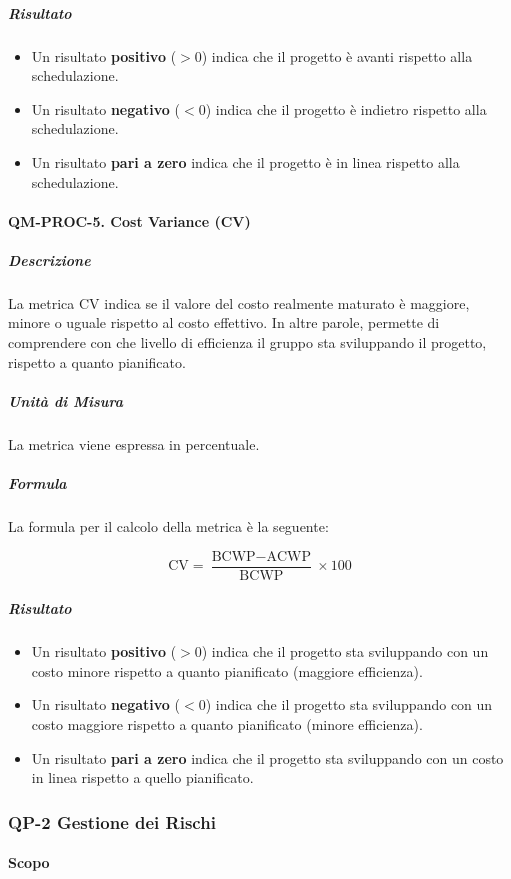 			\subparagraph{Risultato}
			\begin{itemize}
				\item Un risultato \textbf{positivo} (\(> 0\)) indica che il progetto è avanti rispetto alla schedulazione.
				\item Un risultato \textbf{negativo} (\(< 0\)) indica che il progetto è indietro rispetto alla schedulazione.
				\item Un risultato \textbf{pari a zero} indica che il progetto è in linea rispetto alla schedulazione.
			\end{itemize}

		\paragraph{QM-PROC-5. Cost Variance (CV)}

			\subparagraph{Descrizione}
			La metrica CV indica se il valore del costo realmente maturato è maggiore, minore o uguale rispetto al costo effettivo. In altre parole, permette di comprendere con che livello di efficienza il gruppo sta sviluppando il progetto, rispetto a quanto pianificato.

			\subparagraph{Unità di Misura}
			La metrica viene espressa in percentuale.

			\subparagraph{Formula}
			La formula per il calcolo della metrica è la seguente:

			\[
				\text{CV} = \frac{\text{BCWP} - \text{ACWP}}{\text{BCWP}} \times 100
			\]

			\subparagraph{Risultato}
			\begin{itemize}
				\item Un risultato \textbf{positivo} (\(> 0\)) indica che il progetto sta sviluppando con un costo minore rispetto a quanto pianificato (maggiore efficienza).
				\item Un risultato \textbf{negativo} (\(< 0\)) indica che il progetto sta sviluppando con un costo maggiore rispetto a quanto pianificato (minore efficienza).
				\item Un risultato \textbf{pari a zero} indica che il progetto sta sviluppando con un costo in linea rispetto a quello pianificato.
			\end{itemize}

	\subsubsection{QP-2 Gestione dei Rischi}

		\paragraph{Scopo}

